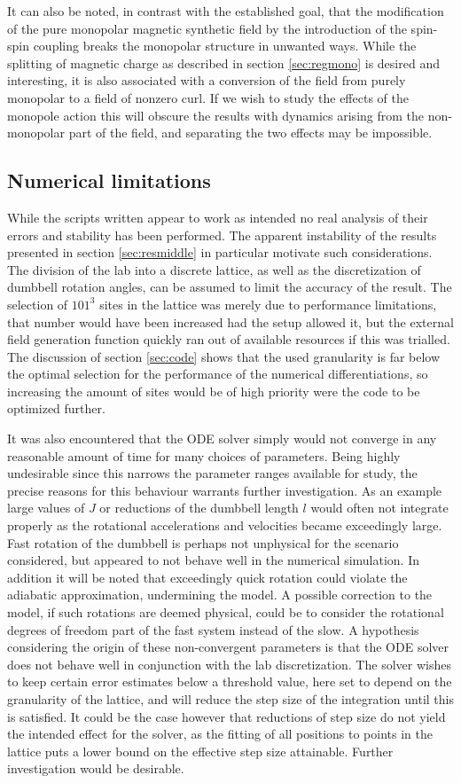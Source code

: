 \documentclass[main.tex]{subfiles}
\begin{document}
It can also be noted, in contrast with the established goal, that the modification of the
pure monopolar magnetic synthetic field by the introduction of the spin-spin coupling
breaks the monopolar structure in unwanted ways. While the splitting of magnetic charge as
described in section \ref{sec:regmono} is desired and interesting, it is also associated
with a conversion of the field from purely monopolar to a field of nonzero curl. If we wish
to study the effects of the monopole action this will obscure the results with dynamics
arising from the non-monopolar part of the field, and separating the two effects may be
impossible.

\subsection{Numerical limitations}
While the scripts written appear to work as intended no real analysis of their errors and
stability has been performed. The apparent instability of the results presented in section
\ref{sec:resmiddle} in particular motivate such considerations. The division of the lab into a discrete lattice, as well as
the discretization of dumbbell rotation angles, can be assumed to limit the accuracy of the
result. The selection of \(101^3\) sites in the lattice was merely due to performance
limitations, that number would have been increased had the setup allowed it, but the external
field generation function quickly ran out of available resources if this was trialled. The
discussion of section \ref{sec:code} shows that the used granularity is far below the
optimal selection for the performance of the numerical differentiations, so increasing the
amount of sites would be of high priority were the code to be optimized further.

It was also encountered that the ODE solver simply would not converge in any
reasonable amount of time for many
choices of parameters. Being highly undesirable since this narrows the parameter ranges available
for study, the precise reasons for this behaviour warrants further investigation. As an
example large values of \(J\) or reductions of the dumbbell length \(l\) would often not
integrate properly as the rotational accelerations and velocities became exceedingly large.
Fast rotation of the dumbbell is perhaps not unphysical for the scenario considered, but
appeared to not behave well in the numerical simulation. In addition it will be noted that
exceedingly quick rotation could violate the adiabatic approximation, undermining the
model. A possible correction to the model, if such rotations are deemed physical, could be to consider
the rotational degrees of freedom part of the fast system instead of the slow. A hypothesis considering the origin of these non-convergent parameters is that the
ODE solver does not behave well in conjunction with the lab discretization. The solver
wishes to keep certain error estimates below a threshold value, here set to depend on the
granularity of the lattice, and will reduce the step size of the integration until this is
satisfied. It could be the case however that reductions of step size do not yield the
intended effect for the solver, as the fitting of all positions to points in the lattice
puts a lower bound on the effective step size attainable. Further investigation would be
desirable.
\end{document}
